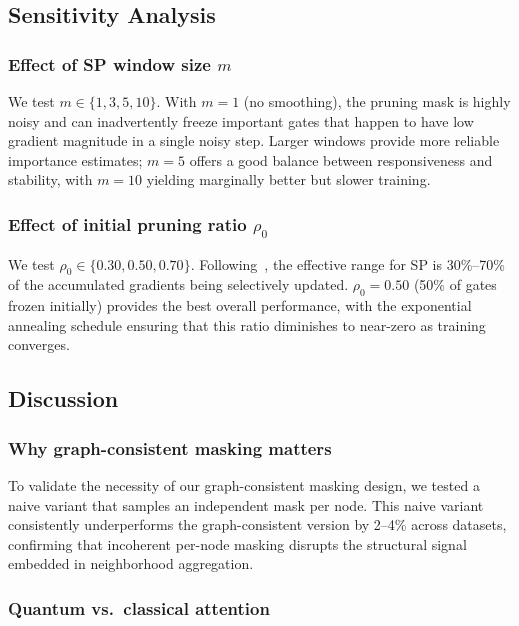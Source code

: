 \documentclass[journal]{IEEEtran}
\begin{document}
\subsection{Sensitivity Analysis}


\subsubsection{Effect of SP window size $m$}

We test $m \in \{1, 3, 5, 10\}$. With $m = 1$ (no smoothing), the
pruning mask is highly noisy and can inadvertently freeze important
gates that happen to have low gradient magnitude in a single noisy
step. Larger windows provide more reliable importance estimates; $m = 5$
offers a good balance between responsiveness and stability, with $m = 10$
yielding marginally better but slower training.

\subsubsection{Effect of initial pruning ratio $\rho_0$}

We test $\rho_0 \in \{0.30, 0.50, 0.70\}$. Following~\cite{QDrop2025ICC},
the effective range for SP is 30\%--70\% of the accumulated gradients
being selectively updated. $\rho_0 = 0.50$ (50\% of gates frozen
initially) provides the best overall performance, with the exponential
annealing schedule ensuring that this ratio diminishes to near-zero
as training converges.

\subsection{Discussion}

\subsubsection{Why graph-consistent masking matters}

To validate the necessity of our graph-consistent masking design, we
tested a naive variant that samples an independent mask per node. This
naive variant consistently underperforms the graph-consistent version by
2--4\% across datasets, confirming that incoherent per-node masking
disrupts the structural signal embedded in neighborhood aggregation.

\subsubsection{Quantum vs.\ classical attention}
\end{document}
